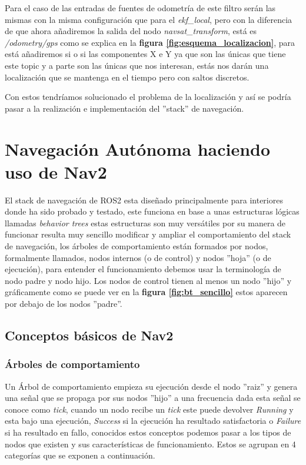 Para el caso de las entradas de fuentes de odometría de este filtro serán las mismas con la misma configuración que para el 
\textit{ekf\_local}, pero con la diferencia de que ahora añadiremos la salida del nodo \textit{navsat\_transform}, está es 
\textit{/odometry/gps} como se explica en la \textbf{figura \ref{fig:esquema_localizacion}}, para está añadiremos si o si las 
componentes X e Y ya que son las únicas que tiene este topic y a parte son las únicas que nos interesan,
 estás nos darán una localización que se mantenga en el tiempo pero con saltos discretos.

Con estos tendríamos solucionado el problema de la localización y así se podría pasar a la realización e implementación del ''stack'' 
de navegación.

\section{Navegación Autónoma haciendo uso de Nav2}

El stack de navegación de ROS2 esta diseñado principalmente para interiores donde ha sido probado y testado, este funciona en base a unas estructuras 
lógicas llamadas \textit{behavior trees} \cite{colledanchise2018behavior} estas estructuras son muy versátiles por su manera de funcionar resulta muy 
sencillo modificar y ampliar el comportamiento del stack de navegación, los árboles de comportamiento están formados por nodos, formalmente llamados, 
nodos internos (o de control) y nodos ''hoja'' (o de ejecución), para entender el funcionamiento debemos usar la terminología de nodo padre y nodo hijo. 
Los nodos de control tienen al menos un nodo ''hijo'' y gráficamente como se puede ver en la \textbf{figura \ref{fig:bt_sencillo}}  estos aparecen por debajo de 
los nodos ''padre''.

\subsection{Conceptos básicos de Nav2}
\subsubsection{Árboles de comportamiento}
Un Árbol de comportamiento empieza su ejecución desde el nodo ''raiz'' y genera una señal que se propaga por sus nodos ''hijo'' a una frecuencia dada 
esta señal se conoce como \textit{tick}, cuando un nodo recibe un \textit{tick} este puede devolver \textit{Running} y esta bajo una ejecución, 
\textit{Success} si la ejecución ha resultado satisfactoria o \textit{Failure} si ha resultado en fallo, conocidos estos conceptos podemos pasar 
a los tipos de nodos que existen y sus características de funcionamiento. Estos se agrupan en 4 categorías que se exponen a continuación.

